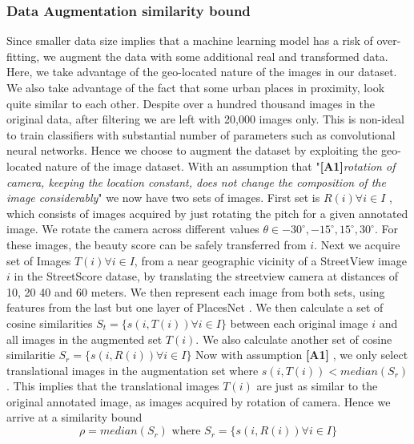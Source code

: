 \subsubsection{Data Augmentation similarity bound}
\label{sec:bound}
Since smaller data size implies that a machine learning model has a risk of over-fitting,
we augment the data with some additional real and transformed data. Here, we take advantage of the geo-located nature of the images in our dataset. We also take advantage of the fact that some urban places in proximity, look quite similar to each other. 
Despite over a hundred thousand images in the original data, after filtering we are left with 20,000 images only.
This is non-ideal to train classifiers with substantial number of parameters such as convolutional neural networks.
Hence we choose to augment the dataset by exploiting the geo-located nature of the image dataset. 
With an assumption that "\textbf{[A1]}\textit{rotation of camera, keeping the location constant, does not change the composition of the image considerably}" we now have two sets of images. 
First set  is $R(i) \forall i \in I$ , which consists of images acquired by just rotating the pitch for a given annotated image. We rotate the camera across different values $\theta \in {-30^{\circ}, -15^{\circ} , 15^{\circ} , 30^{\circ} }$. For these images, the beauty score can be safely transferred from $i$. 
Next we  acquire set of Images $T(i) \forall i \in I$, from a near geographic vicinity of a StreetView image $i$ in the StreetScore datase, by translating the streetview  camera at distances of 10, 20 40 and 60 meters. 
We then represent each image from both sets, using features from the last but one layer of PlacesNet \cite{zhou2014learning}. We then calculate a set of cosine similarities $ S_t = \{s(i,T(i)) \forall i \in I \}$
between each original image $i$ and all images in the augmented set $T(i)$. 
We also calculate another set of cosine similaritie  $ S_r = \{s(i,R(i)) \forall i \in I \}$
Now with assumption \textbf{[A1]} , we only select translational images in the augmentation set where $s(i,T(i)) < median(S_r)$. This implies that the translational images  $T(i) $ are just as similar to the original annotated image, as images acquired by rotation of camera. 
Hence we arrive at a similarity bound
\begin{equation}
\rho = median(S_r) \text{ where }{S_r} = \{s(i,R(i)) \forall i \in I \}
\label{eq:bound}
\end{equation}

